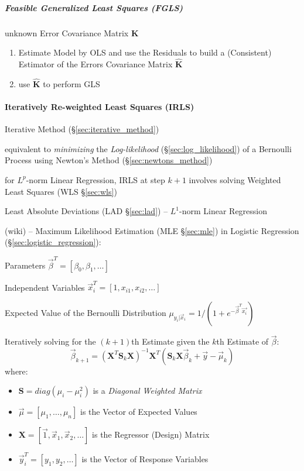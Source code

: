 \subparagraph{Feasible Generalized Least Squares (FGLS)}\label{sec:fgls}\hfill

unknown Error Covariance Matrix $\mathbf{K}$

\begin{enumerate}
  \item Estimate Model by OLS and use the Residuals to build a (Consistent)
    Estimator of the Errors Covariance Matrix $\hat{\mathbf{K}}$
  \item use $\hat{\mathbf{K}}$ to perform GLS
\end{enumerate}



\paragraph{Iteratively Re-weighted Least Squares (IRLS)}\label{sec:irls}\hfill

Iterative Method (\S\ref{sec:iterative_method})

equivalent to \emph{minimizing} the \emph{Log-likelihood}
(\S\ref{sec:log_likelihood}) of a Bernoulli Process using Newton's Method
(\S\ref{sec:newtons_method})

for $L^p$-norm Linear Regression, IRLS at step $k+1$ involves solving Weighted
Least Squares (WLS \S\ref{sec:wls})

Least Absolute Deviations (LAD \S\ref{sec:lad}) -- $L^1$-norm Linear Regression

(wiki) --
Maximum Likelihood Estimation (MLE \S\ref{sec:mle}) in Logistic Regression
(\S\ref{sec:logistic_regression}):

Parameters $\vec{\beta}^T = [\beta_0, \beta_1, \ldots]$

Independent Variables $\vec{x}_i^T = [1, x_{i1}, x_{i2}, \ldots]$

Expected Value of the Bernoulli Distribution
$\mu_{y_i | \vec{x}_i} = 1 / (1 + e^{-\vec{\beta}^T \vec{x_i}})$

Iteratively solving for the $(k+1)$th Estimate given the $k$th Estimate of
$\vec{\beta}$:
\[
  \vec{\beta}_{k+1} = (\mathbf{X}^T \mathbf{S}_k \mathbf{X})^{-1} \mathbf{X}^T
    (\mathbf{S}_k \mathbf{X} \vec{\beta}_k + \vec{y} - \vec{\mu}_k)
\]
where:
\begin{itemize}
  \item $\mathbf{S} = diag(\mu_i - \mu_i^2)$ is a
    \emph{Diagonal Weighted Matrix}
  \item $\vec{\mu} = [\mu_1, \ldots, \mu_n]$ is the Vector of Expected Values
  \item $\mathbf{X} = [\vec{1}, \vec{x}_1, \vec{x}_2, \ldots]$ is the Regressor
    (Design) Matrix
  \item $\vec{y}_i^T = [y_1, y_2, \ldots]$ is the Vector of Response Variables
\end{itemize}



